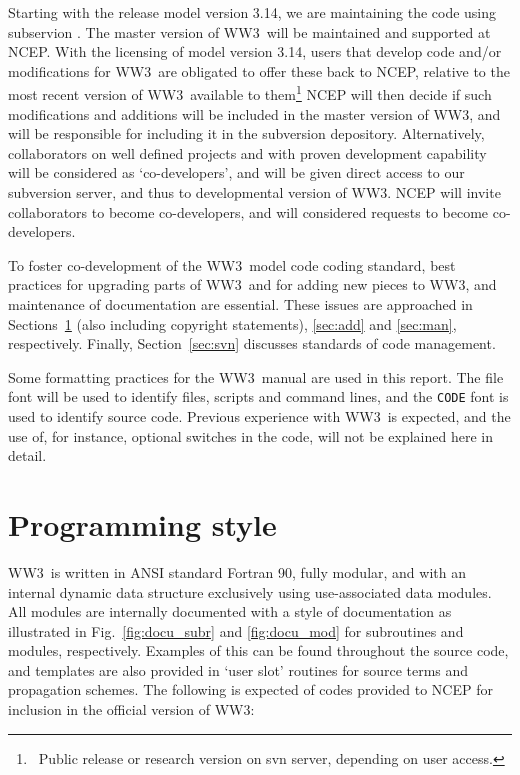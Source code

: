 \documentclass[12pt]{article}
\newcommand{\ws}{WW3}
\newcommand{\file}{\sf}
\newcommand{\code}{\tt}
\newcommand{\pb}{\strut \vfill \pagebreak}
\newcommand{\bpage}{\vfill \pagebreak \strut

\vspace{2.5in} \centerline{This page is intentionally left blank.}}
\newcommand{\newsec}{\setcounter{equation}{0}
                      \setcounter{myfigno}{0}
                      \setcounter{mytabno}{0}}
\newcounter{myfigno}[section]
\newcounter{mytabno}[section]
\begin{document}
Starting with the release model version 3.14, we are maintaining the code
using subservion \citep{bk:CSea06}. The master version of \ws\ will be
maintained and supported at NCEP. With the licensing of model version 3.14,
users that develop code and/or modifications for \ws\ are obligated to offer
these back to NCEP, relative to the most recent version of \ws\ available to
them\footnote{~Public release or research version on svn server, depending on
user access.} NCEP will then decide if such modifications and additions will
be included in the master version of \ws, and will be responsible for
including it in the subversion depository. Alternatively, collaborators on
well defined projects and with proven development capability will be
considered as `co-developers', and will be given direct access to our
subversion server, and thus to developmental version of \ws. NCEP will invite
collaborators to become co-developers, and will considered requests to become
co-developers.

To foster co-development of the \ws\ model code coding standard, best
practices for upgrading parts of \ws\ and for adding new pieces to \ws, and
maintenance of documentation are essential. These issues are approached in
Sections~\ref{sec:style} (also including copyright statements), \ref{sec:add}
and \ref{sec:man}, respectively.  Finally, Section~\ref{sec:svn} discusses
standards of code management.

Some formatting practices for the \ws\ manual are used in this report. The
{\file file} font will be used to identify files, scripts and command lines,
and the {\code CODE} font is used to identify source code. Previous experience
with \ws\ is expected, and the use of, for instance, optional switches in the
code, will not be explained here in detail.

\pb
\section{Programming style} \label{sec:style}
\newsec

\ws\ is written in ANSI standard Fortran 90, fully modular, and with an
internal dynamic data structure exclusively using use-associated data modules.
All modules are internally documented with a style of documentation as
illustrated in Fig.~\ref{fig:docu_subr} and \ref{fig:docu_mod} for subroutines
and modules, respectively. Examples of this can be found throughout the source
code, and templates are also provided in `user slot' routines for source terms
and propagation schemes. The following is expected of codes provided to NCEP
for inclusion in the official version of \ws :
\end{document}
